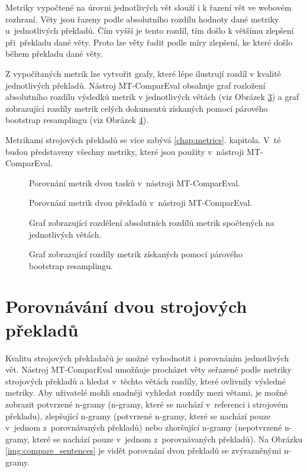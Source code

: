 Metriky vypočtené na úrovni jednotlivých vět slouží i k řazení vět ve webovém rozhraní.
Věty jsou řazeny podle absolutního rozdílu hodnoty dané metriky u~jednotlivých překladů.
Čím vyšší je tento rozdíl, tím došlo k většímu zlepšení při~překladu dané věty.
Proto lze věty řadit podle míry zlepšení, ke které došlo během překladu dané věty. 

Z vypočítaných metrik lze vytvořit grafy,
  které lépe ilustrují rozdíl v kvalitě jednotlivých překladů.
Nástroj \mbox{MT-ComparEval} obsahuje graf rozložení absolutního rozdílu výsledků metrik v jednotlivých větách (viz Obrázek \ref{img:chart-metrics-sentences})
  a graf zobrazující rozdíly metrik celých dokumentů získaných pomocí párového bootstrap resamplingu (viz Obrázek \ref{img:chart-metrics-bs}).

Metrikami strojových překladů se více zabývá \ref{chap:metrics}. kapitola.
V~té budou představeny všechny metriky,
  které jsou použity v~nástroji \mbox{MT-ComparEval}.


\begin{figure}
	\caption{Porovnání metrik dvou tasků v~nástroji \mbox{MT-ComparEval}.}
	\label{img:compare_metrics_tasks}
\end{figure}

\begin{figure}
	\caption{Porovnání metrik dvou překladů v~nástroji \mbox{MT-ComparEval}.}
	\label{img:compare_metrics_sentences}
\end{figure}

\begin{figure}
	\caption{Graf zobrazující rozdělení absolutních rozdílů metrik spočtených na jednotlivých větách.}
	\label{img:chart-metrics-sentences}
\end{figure}

\begin{figure}
	\caption{Graf zobrazující rozdíly metrik získaných pomocí párového bootstrap resamplingu.}
	\label{img:chart-metrics-bs}
\end{figure}

\section{Porovnávání dvou strojových překladů}
Kvalitu strojových překladačů je možné vyhodnotit i porovnáním jednotlivých vět.
Nástroj \mbox{MT-ComparEval} umožňuje procházet věty seřazené podle metriky strojových překladů 
  a hledat v~těchto větách rozdíly,
  které ovlivnily výsledné metriky.
Aby uživatelé mohli snadněji vyhledat rozdíly mezi větami,
  je možné zobrazit potvrzené \mbox{n-gramy} (\mbox{n-gramy}, které se nachází v~referenci i strojovém překladu),
  zlepšující \mbox{n-gramy} (potvrzené \mbox{n-gramy}, které se nachází pouze v~jednom z~porovnávaných překladů)
  nebo zhoršující \mbox{n-gramy} (nepotvrzené \mbox{n-gramy}, které se nachází pouze v~jednom z~porovnávaných překladů).
Na Obrázku \ref{img:compare_sentences} je vidět porovnání dvou překladů se zvýrazněnými \mbox{n-gramy}.

